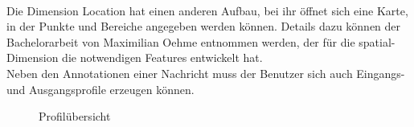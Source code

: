 \\Die Dimension Location hat einen anderen Aufbau, bei ihr öffnet sich eine Karte, in der Punkte und Bereiche angegeben werden können. Details dazu können der Bachelorarbeit von Maximilian Oehme entnommen werden, der für die spatial-Dimension die notwendigen Features entwickelt hat.
\\Neben den Annotationen einer Nachricht muss der Benutzer sich auch Eingangs- und Ausgangsprofile erzeugen können. \newline\newline
\hspace*{0cm}
\begin{minipage}{0.47\linewidth}
	\begin{figure}[H]
		\centering
		\caption{Profilübersicht}
		\label{fig:profile1}
	\end{figure}
\end{minipage}
